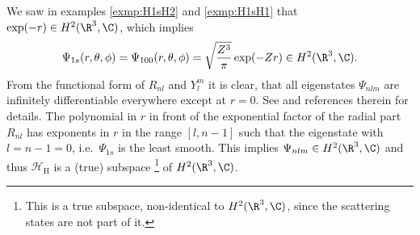 We saw in examples \vref{exmp:H1sH2} and \vref{exmp:H1sH1}
that $\exp(-r) \in H^2(\R^3, \C)$,
which implies
\begin{equation}
	\Psi_{1s}(r, \theta, \phi) = \Psi_{100}(r, \theta, \phi)
	= \sqrt{\frac{Z^3}{\pi}} \exp(-Z r) \in H^2(\R^3, \C).
	\label{eqn:FunctionGShydrogen}
\end{equation}
From the functional form of $R_{nl}$ and $Y_l^m$ it is clear,
that all eigenstates $\Psi_{nlm}$ are infinitely differentiable everywhere
except at $r = 0$.
See \cite{Kato1957} and references therein for details.
The polynomial in $r$ in front of the exponential factor of the radial part $R_{nl}$
has exponents in $r$ in the range $[l, n-1]$
such that the eigenstate with $l = n-1 = 0$, i.e.~$\Psi_{1s}$ is the least smooth.
This implies $\Psi_{nlm} \in H^2(\R^3, \C)$ and thus
$\mathcal{H}_\text{H}$ is a (true) subspace%
\footnote{
	This is a true subspace, \ie non-identical to $H^2(\R^3, \C)$,
	since the scattering states are not part of it.
}
of $H^2(\R^3, \C)$.
